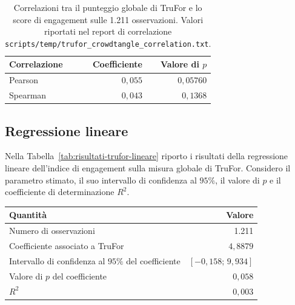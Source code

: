 \begin{table}[htbp]
    \centering
    \small
    \caption{Correlazioni tra il punteggio globale di TruFor e lo score di engagement sulle 1.211 osservazioni. Valori riportati nel report di correlazione \texttt{scripts/temp/trufor\_crowdtangle\_correlation.txt}.}
    \label{tab:risultati-trufor-correlazioni}
    \begin{tabular}{@{}lrr@{}}
        \toprule
        Correlazione & Coefficiente & Valore di $p$ \\
        \midrule
        Pearson & $0{,}055$ & $0{,}05760$ \\
        Spearman & $0{,}043$ & $0{,}1368$ \\
        \bottomrule
    \end{tabular}
\end{table}

\subsection{Regressione lineare}
\label{subsec:risultati-trufor-lineare}

Nella Tabella~\ref{tab:risultati-trufor-lineare} riporto i risultati della regressione lineare dell'indice di engagement sulla misura globale di TruFor. Considero il parametro stimato, il suo intervallo di confidenza al $95\%$, il valore di $p$ e il coefficiente di determinazione $R^2$.

\bigskip\noindent
\begin{minipage}{\linewidth}
    \centering
    \small
    \makeatletter{}\makeatother
    \caption{Regressione lineare con l’indicatore globale di TruFor e l'intercetta. Il valore di $R^2$ riguarda i dati usati per la stima. Fonte: report di regressione \texttt{scripts/temp/trufor\_crowdtangle\_regression.txt}.}
    \label{tab:risultati-trufor-lineare}
    \begin{tabular}{@{}lr@{}}
        \toprule
        Quantità & Valore \\
        \midrule
        Numero di osservazioni & 1.211 \\
        Coefficiente associato a TruFor & $4{,}8879$ \\
        Intervallo di confidenza al $95\%$ del coefficiente & $[-0{,}158;\,9{,}934]$ \\
        Valore di $p$ del coefficiente & $0{,}058$ \\
        $R^2$ & $0{,}003$ \\
        \bottomrule
    \end{tabular}
\end{minipage}
\bigskip

